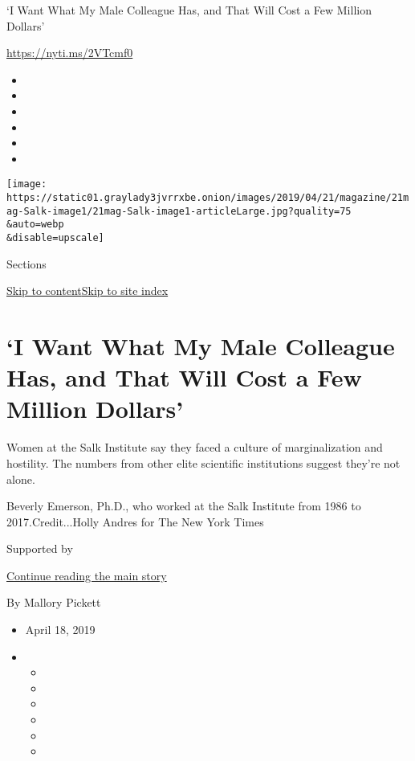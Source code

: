 `I Want What My Male Colleague Has, and That Will Cost a Few Million
Dollars'

\url{https://nyti.ms/2VTcmf0}

\begin{itemize}
\item
\item
\item
\item
\item
\item
\end{itemize}

\texttt{[image: https://static01.graylady3jvrrxbe.onion/images/2019/04/21/magazine/21mag-Salk-image1/21mag-Salk-image1-articleLarge.jpg?quality=75\\\&auto=webp\\\&disable=upscale]}

Sections

\protect\hyperlink{site-content}{Skip to
content}\protect\hyperlink{site-index}{Skip to site index}

\hypertarget{i-want-what-my-male-colleague-has-and-that-will-cost-a-few-million-dollars}{%
\section{`I Want What My Male Colleague Has, and That Will Cost a Few
Million
Dollars'}\label{i-want-what-my-male-colleague-has-and-that-will-cost-a-few-million-dollars}}

Women at the Salk Institute say they faced a culture of marginalization
and hostility. The numbers from other elite scientific institutions
suggest they're not alone.

Beverly Emerson, Ph.D., who worked at the Salk Institute from 1986 to
2017.Credit...Holly Andres for The New York Times

Supported by

\protect\hyperlink{after-sponsor}{Continue reading the main story}

By Mallory Pickett

\begin{itemize}
\item
  April 18, 2019
\item
  \begin{itemize}
  \item
  \item
  \item
  \item
  \item
  \item
  \end{itemize}
\end{itemize}


